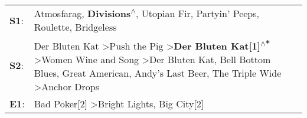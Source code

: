 \begin{supertabular}{p{0.03\textwidth}p{0.92\textwidth}}
 \textbf{S1}:  &                                                                                                                                                                                                                                                                           Atmosfarag\textsuperscript{}, \enspace \textbf{Divisions\textsuperscript{$\wedge$}}, \enspace Utopian Fir\textsuperscript{}, \enspace Partyin' Peeps\textsuperscript{}, \enspace Roulette\textsuperscript{}, \enspace Bridgeless\textsuperscript{}  \enspace  \\
 \textbf{S2}:  &  Der Bluten Kat\textsuperscript{} \textgreater \enspace Push the Pig\textsuperscript{} \textgreater \enspace \textbf{Der Bluten Kat[1]\textsuperscript{$\wedge$*}} \textgreater \enspace Women Wine and Song\textsuperscript{} \textgreater \enspace Der Bluten Kat\textsuperscript{}, \enspace Bell Bottom Blues\textsuperscript{}, \enspace Great American\textsuperscript{}, \enspace Andy's Last Beer\textsuperscript{}, \enspace The Triple Wide\textsuperscript{} \textgreater \enspace Anchor Drops\textsuperscript{}  \enspace  \\
 \textbf{E1}:  &                                                                                                                                                                                                                                                                                                                                                                                                                            Bad Poker[2]\textsuperscript{} \textgreater \enspace Bright Lights, Big City[2]\textsuperscript{}  \enspace  \\
\end{supertabular}
